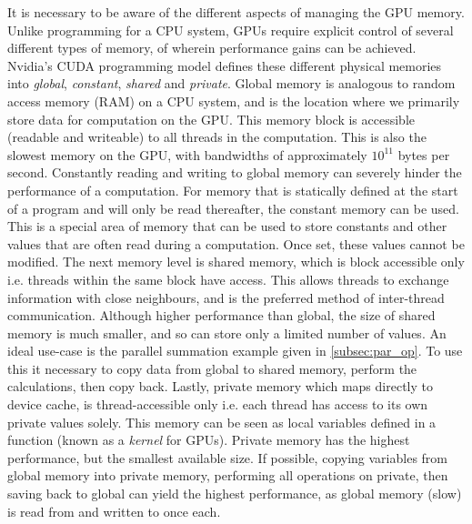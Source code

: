 It is necessary to be aware of the different aspects of managing the GPU memory. Unlike programming for a CPU system, GPUs require explicit control of several different types of memory, of wherein performance gains can be achieved. Nvidia's CUDA programming model defines these different physical memories into \textit{global}, \textit{constant}, \textit{shared} and \textit{private}. Global memory is analogous to random access memory (RAM) on a CPU system, and is the location where we primarily store data for computation on the GPU. This memory block is accessible (readable and writeable) to all threads in the computation. This is also the slowest memory on the GPU, with bandwidths of approximately $10^{11}$ bytes per second. Constantly reading and writing to global memory can severely hinder the performance of a computation. For memory that is statically defined at the start of a program and will only be read thereafter, the constant memory can be used. This is a special area of memory that can be used to store constants and other values that are often read during a computation. Once set, these values cannot be modified. The next memory level is shared memory, which is block accessible only i.e. threads within the same block have access. This allows threads to exchange information with close neighbours, and is the preferred method of inter-thread communication. Although higher performance than global, the size of shared memory is much smaller, and so can store only a limited number of values. An ideal use-case is the parallel summation example given in \ref{subsec:par_op}. To use this it necessary to copy data from global to shared memory, perform the calculations, then copy back. Lastly, private memory which maps directly to device cache, is thread-accessible only i.e. each thread has access to its own private values solely. This memory can be seen as local variables defined in a function (known as a \textit{kernel} for GPUs). Private memory has the highest performance, but the smallest available size. If possible, copying variables from global memory into private memory, performing all operations on private, then saving back to global can yield the highest performance, as global memory (slow) is read from and written to once each.

